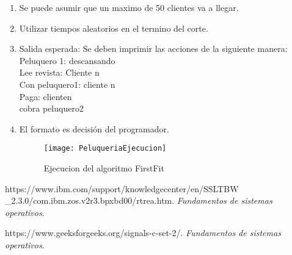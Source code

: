 \documentclass[a4paperx]{article}
\begin{document}
\begin{enumerate}
\begin{enumerate}
\item{Se puede asumir que un maximo de 50 clientes va a llegar.}\\

\item{Utilizar tiempos aleatorios en el termino del corte.}\\

\item{Salida esperada: Se deben imprimir las acciones de la siguiente manera:
Peluquero 1: descansando\\
Lee revista: Cliente n\\
Con peluquero1: cliente n\\
Paga: clienten\\
cobra peluquero2}\\

\item{El formato es decisi\'on del programador.}\\

\begin{figure}[H]
\centering
\texttt{[image: PeluqueriaEjecucion]}
\caption{Ejecucion del algoritmo FirstFit}
\end{figure}

\end{enumerate}

\end{enumerate}

\begin{thebibliography}{99}

 https://www.ibm.com/support/knowledgecenter/en/SSLTBW\\
\_2.3.0/com.ibm.zos.v2r3.bpxbd00/rtrea.htm. {\it Fundamentos de sistemas operativos}. 

  https://www.geeksforgeeks.org/signals-c-set-2/. {\it Fundamentos de sistemas operativos}. 

\end{thebibliography}
\end{document}
